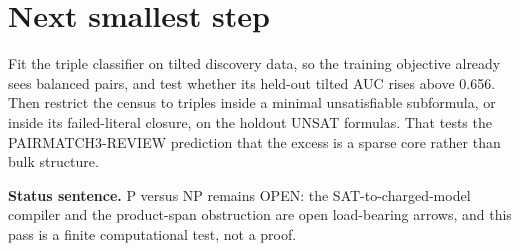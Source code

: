 \documentclass[11pt]{article}
\begin{document}
\section*{Next smallest step}
Fit the triple classifier on tilted discovery data, so the training objective already sees balanced pairs, and test whether its held-out tilted AUC rises above 0.656. Then restrict the census to triples inside a minimal unsatisfiable subformula, or inside its failed-literal closure, on the holdout UNSAT formulas. That tests the PAIRMATCH3-REVIEW prediction that the excess is a sparse core rather than bulk structure.

\bigskip
\noindent\textbf{Status sentence.} P versus NP remains OPEN: the SAT-to-charged-model compiler and the product-span obstruction are open load-bearing arrows, and this pass is a finite computational test, not a proof.
\end{document}
